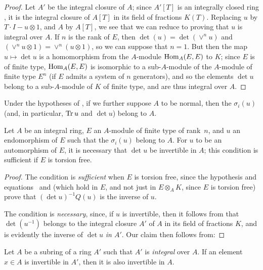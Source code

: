 \begin{proof}
Let $A'$ be the integral closure of $A$;
since $A'[T]$ is an integrally closed ring \cite[p.~99]{II-24}, it is the integral closure of $A[T]$ in its field of fractions $K(T)$.
Replacing $u$ by $T\cdot I-u\otimes1$, and $A$ by $A[T]$, we see that we can reduce to proving that $u$ is integral over $A$.
If $n$ is the rank of $E$, then $\det(u)=\det(\vee^n u)$ and $(\vee^n u\otimes1)=\vee^n(u\otimes1)$, so we can suppose that $n=1$.
But then the map $u\mapsto\det u$ is a homomorphism from the $A$-module $\operatorname{Hom}_A(E,E)$ to $K$;
since $E$ is of finite type, $\operatorname{Hom}_A(E,E)$ is isomorphic to a sub-$A$-module of the $A$-module of finite type $E^n$ (if $E$ admits a system of $n$ generators), and so the elements $\det u$ belong to a sub-$A$-module of $K$ of finite type, and are thus integral over $A$.
\end{proof}

\begin{corollary}[6.4.4]
\label{II.6.4.4}
Under the hypotheses of , if we further suppose $A$ to be normal, then the $\sigma_i(u)$ (and, in particular, $\operatorname{Tr} u$ and $\det u$) belong to $A$.
\end{corollary}

\begin{proposition}[6.4.5]
\label{II.6.4.5}
Let $A$ be an integral ring, $E$ an $A$-module of finite type of rank~$n$, and $u$ an endomorphism of $E$ such that the $\sigma_i(u)$ belong to $A$.
For $u$ to be an automorphism of $E$, it is necessary that $\det u$ be invertible in $A$;
this condition is sufficient if $E$ is torsion free.
\end{proposition}

\begin{proof}
The condition is \emph{sufficient} when $E$ is torsion free, since the hypothesis and equations~ and  (which hold in $E$, and not just in $E\otimes_A K$, since $E$ is torsion free) prove that $(\det u)^{-1}Q(u)$ is the inverse of $u$.

The condition is \emph{necessary}, since, if $u$ is invertible, then it follows from  that $\det(u^{-1})$ belongs to the integral closure $A'$ of $A$ in its field of fractions $K$, and is evidently the inverse of $\det u$ \emph{in $A'$}.
Our claim then follows from:
\end{proof}

\begin{lemma}[6.4.5.1]
\label{II.6.4.5.1}
Let $A$ be a subring of a ring $A'$ such that $A'$ is \emph{integral} over $A$.
If an element $x\in A$ is invertible in $A'$, then it is also invertible in $A$.
\end{lemma}

